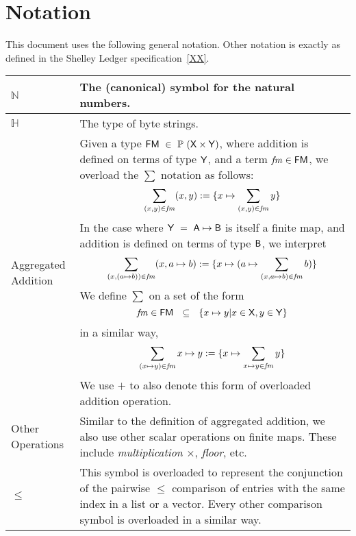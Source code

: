 \section{Notation}
\label{sec:notation-shelley}

This document uses the following general notation.  Other notation is exactly as defined in the Shelley Ledger specification~\ref{XX}.

\vspace{20pt}
\begin{center}
\begin{tabular}{||l|p{4in}||}\hline
  $\mathbb{N}$ & The (canonical) symbol for the natural numbers.
\\\hline
  $\mathbb{H}$ & The type of byte strings.
\\\hline
Aggregated Addition &
Given a type
  $\mathsf{FM}~\in~ \mathbb{P}~(\mathsf{X} \times \mathsf{Y})$,
    where addition is defined on terms of type $\mathsf{Y}$, and a term $\mathit{fm} \in \mathsf{FM}$,
    we overload the $\sum$ notation as follows:
    \[\sum_{(x, y)\in\mathit{fm}} (x,y) :=
    \{ x\mapsto \sum_{(x,y)\in\mathit{fm}} y \} \]
%
    In the case where $\mathsf{Y}~=~\mathsf{A}\mapsto\mathsf{B}$ is itself a finite map,
    and addition is defined on terms of type $\mathsf{B}$,
    we interpret
    \[\sum_{(x, (a\mapsto b))\in\mathit{fm}} (x,a\mapsto b) :=
    \{ x \mapsto (a\mapsto \sum_{(x,a\mapsto b)\in\mathit{fm}} b) \} \]
%
    We define $\sum$ on a set of the form
    \[\mathit{fm} \in \mathsf{FM}~~ \subseteq ~~ \{ x \mapsto y \vert x \in \mathsf{X}, y \in \mathsf{Y} \} \]
%
    in a similar way,
    \[\sum_{(x\mapsto y)\in\mathit{fm}} x \mapsto y :=
    \{ x\mapsto \sum_{x\mapsto y\in\mathit{fm}} y \} \]
%
    We use $+$ to also denote this form of overloaded addition operation.
    \\\hline
Other Operations &
  Similar to the definition of aggregated addition, we also
  use other scalar operations on finite maps. These include \emph{multiplication} $\times$,
  \emph{floor}, etc.
\\\hline
$\leq$ &
  This symbol is overloaded to represent the conjunction of the
  pairwise $\leq$ comparison of entries with the same index in a list or a vector.
  Every other comparison symbol is overloaded in a similar way.
  \\\hline
\end{tabular}
\end{center}


\clearpage
